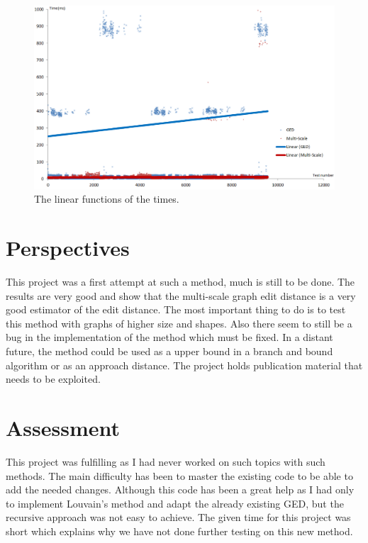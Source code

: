 \documentclass[UTF8, twoside]{EPURapport}
\begin{document}
\begin{figure} [h]
	\centering \includegraphics[width=18cm]{images/GEDvsMultiScaleTimePlot.png}
	\caption {The linear functions of the times.}
	\label {timeplot}
\end{figure}

\chapter{Perspectives}

	\hspace{4ex}This project was a first attempt at such a method, much is still to be done. The results are very good and show that the multi-scale graph edit distance is a very good estimator of the edit distance. The most important thing to do is to test this method with graphs of higher size and shapes. Also there seem to still be a bug in the implementation of the method which must be fixed. In a distant future, the method could be used as a upper bound in a branch and bound algorithm or as an approach distance. The project holds publication material that needs to be exploited.

\chapter{Assessment}

	\hspace{4ex}This project was fulfilling as I had never worked on such topics with such methods. The main difficulty has been to master the existing code to be able to add the needed changes. Although this code has been a great help as I had only to implement Louvain's method and adapt the already existing GED, but the recursive approach was not easy to achieve. The given time for this project was short which explains why we have not done further testing on this new method.
\end{document}
